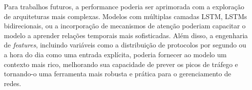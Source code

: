 Para trabalhos futuros, a performance poderia ser aprimorada com a exploração de arquiteturas mais complexas.
Modelos com múltiplas camadas LSTM, LSTMs bidirecionais, ou a incorporação de mecanismos de atenção poderiam
capacitar o modelo a aprender relações temporais mais sofisticadas. Além disso, a engenharia de
\emph{features}, incluindo variáveis como a distribuição de protocolos por segundo ou a hora do dia como uma
entrada explícita, poderia fornecer ao modelo um contexto mais rico, melhorando sua capacidade de prever os
picos de tráfego e tornando-o uma ferramenta mais robusta e prática para o gerenciamento de redes.
